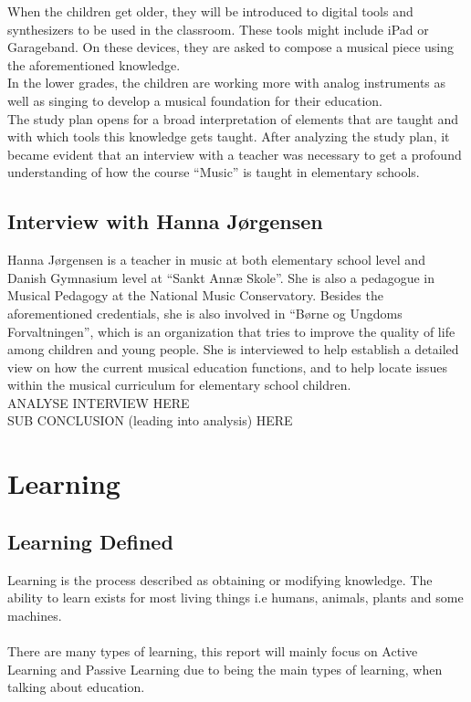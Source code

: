 	When the children get older, they will be introduced to digital tools and synthesizers to be used in the classroom. These tools might include iPad or Garageband. On these devices, they are asked to compose a musical piece using the aforementioned knowledge.\\
	In the lower grades, the children are working more with analog instruments as well as singing to develop a musical foundation for their education.
	\\
	
	The study plan opens for a broad interpretation of elements that are taught and with which tools this knowledge gets taught. After analyzing the study plan, it became evident that an interview with a teacher was necessary to get a profound understanding of how the course “Music” is taught in elementary schools.\\
	
	\subsection{Interview with Hanna Jørgensen}
	Hanna Jørgensen is a teacher in music at both elementary school level and Danish Gymnasium level at “Sankt Annæ Skole”. She is also a pedagogue in Musical Pedagogy at the National Music Conservatory. Besides the aforementioned credentials, she is also involved in “Børne og Ungdoms Forvaltningen”, which is an organization that tries to improve the quality of life among children and young people. She is interviewed to help establish a detailed view on how the current musical education functions, and to help locate issues within the musical curriculum for elementary school children.\\
	
	ANALYSE INTERVIEW HERE\\
	
	SUB CONCLUSION (leading into analysis) HERE\\
\section{Learning}
	\subsection{Learning Defined}\label{sec:learning}
	Learning is the process described as obtaining or modifying knowledge. The ability to learn exists for most living things i.e humans, animals, plants and some machines. \\
	\\
	There are many types of learning, this report will mainly focus on Active Learning and Passive Learning due to being the main types of learning, when talking about education.
	
